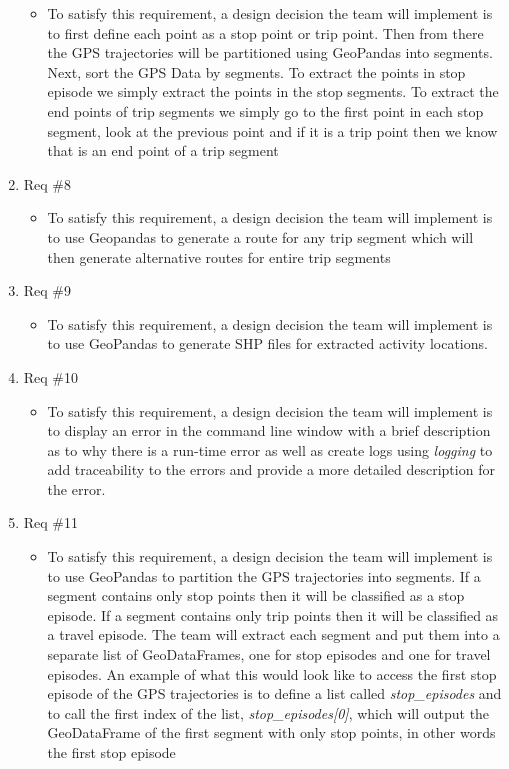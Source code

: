 \documentclass[12pt, titlepage]{article}
\begin{document}
\begin{enumerate}
\begin{itemize}
        \item To satisfy this requirement, a design decision the team will implement is to first define each point as a stop point or trip point. Then from there the GPS trajectories will be partitioned using GeoPandas into segments. Next, sort the GPS Data by segments. To extract the points in stop episode we simply extract the points in the stop segments. To extract the end points of trip segments we simply go to the first point in each stop segment, look at the previous point and if it is a trip point then we know that is an end point of a trip segment
    \end{itemize}
    \item Req \#8
    \begin{itemize}
        \item To satisfy this requirement, a design decision the team will implement is to use Geopandas to generate a route for any trip segment which will then generate alternative routes for entire trip segments
    \end{itemize}
    \item Req \#9
    \begin{itemize}
        \item To satisfy this requirement, a design decision the team will implement is to use GeoPandas to generate SHP files for extracted activity locations.
    \end{itemize}
    \item Req \#10
    \begin{itemize}
        \item To satisfy this requirement, a design decision the team will implement is to display an error in the command line window with a brief description as to why there is a run-time error as well as create logs using \emph{logging} to add traceability to the errors and provide a more detailed description for the error.
    \end{itemize}
    \item Req \#11
    \begin{itemize}
        \item To satisfy this requirement, a design decision the team will implement is to use GeoPandas to partition the GPS trajectories into segments. If a segment contains only stop points then it will be classified as a stop episode. If a segment contains only trip points then it will be classified as a travel episode. The team will extract each segment and put them into a separate list of GeoDataFrames, one for stop episodes and one for travel episodes. An example of what this would look like to access the first stop episode of the GPS trajectories is to define a list called \emph{stop\_episodes} and to call the first index of the list, \emph{stop\_episodes[0]}, which will output the GeoDataFrame of the first segment with only stop points, in other words the first stop episode

\end{itemize}
\end{enumerate}
\end{document}
